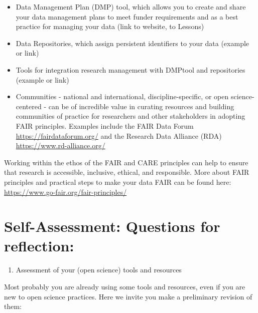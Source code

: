 \documentclass[
  letterpaper,
  DIV=11,
  numbers=noendperiod]{scrreport}
\providecommand{\tightlist}{%
  \setlength{\itemsep}{0pt}\setlength{\parskip}{0pt}}\usepackage{longtable,booktabs,array}
\begin{document}
\begin{itemize}
\tightlist
\item
  Data Management Plan (DMP) tool, which allows you to create and share
  your data management plans to meet funder requirements and as a best
  practice for managing your data (link to website, to Lessons)
\item
  Data Repositories, which assign persistent identifiers to your data
  (example or link)
\item
  Tools for integration research management with DMPtool and
  repositories (example or link)
\item
  Communities - national and international, discipline-specific, or open
  science-centered - can be of incredible value in curating resources
  and building communities of practice for researchers and other
  stakeholders in adopting FAIR principles. Examples include the FAIR
  Data Forum \url{https://fairdataforum.org/} and the Research Data
  Alliance (RDA) \url{https://www.rd-alliance.org/}
\end{itemize}

Working within the ethos of the FAIR and CARE principles can help to
ensure that research is accessible, inclusive, ethical, and responsible.
More about FAIR principles and practical steps to make your data FAIR
can be found here: \url{https://www.go-fair.org/fair-principles/}

\hypertarget{self-assessment-questions-for-reflection}{%
\section*{Self-Assessment: Questions for
reflection:}\label{self-assessment-questions-for-reflection}}


\begin{enumerate}
\def\labelenumi{\arabic{enumi}.}
\tightlist
\item
  Assessment of your (open science) tools and resources
\end{enumerate}

Most probably you are already using some tools and resources, even if
you are new to open science practices. Here we invite you make a
preliminary revision of them:
\end{document}
